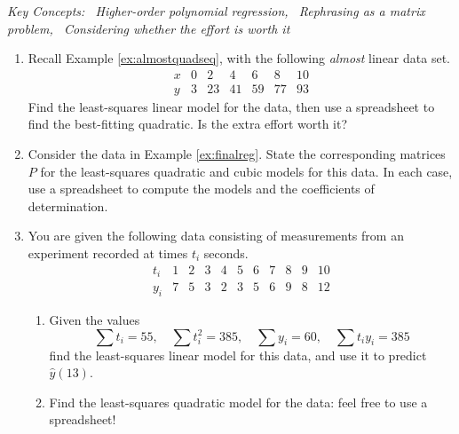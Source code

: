 \pagebreak[3]


\begin{exercises}{}{}
	\hangindent\leftmargini\emph{Key Concepts: \ Higher-order polynomial regression, \ Rephrasing as a matrix problem, \ Considering whether the effort is worth it} 
	
	\begin{enumerate}
	  \item Recall Example \ref{ex:almostquadseq}, with the following \emph{almost} linear data set.
		\[
			\begin{array}{c|cccccc}
				x&0&2&4&6&8&10\\\hline
				y&3&23&41&59&77&93
			\end{array}
		\]
		Find the least-squares linear model for the data, then use a spreadsheet to find the best-fitting quadratic. Is the extra effort worth it? 
		
		
		\item Consider the data in Example \ref{ex:finalreg}. State the corresponding matrices $P$ for the least-squares quadratic and cubic models for this data. In each case, use a spreadsheet to compute the models and the coefficients of determination.
		
	
	  \item You are given the following data consisting of measurements from an experiment recorded at times $t_i$ seconds.
	  \[
	  	\begin{array}{c|cccccccccc}
	  		t_i&1&2&3&4&5&6&7&8&9&10\\\hline
	  		y_i&7&5&3&2&3&5&6&9&8&12
	  	\end{array}
	  \]\vspace*{-\parsep}
	  \begin{enumerate}
	    \item Given the values
	  	\[
	  		\sum t_i=55,\quad \sum t_i^2=385,\quad \sum y_i=60,\quad \sum t_iy_i=385
	  	\]
	  	find the least-squares linear model for this data, and use it to predict $\hat y(13)$.
	    
	    \item Find the least-squares quadratic model for the data: feel free to use a spreadsheet!
	    

\end{enumerate}
\end{enumerate}
\end{exercises}
